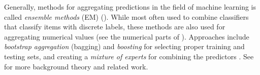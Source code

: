 Generally, methods for aggregating predictions in the field of machine learning is called \emph{ensemble methods} (EM) (\cite{Dietterich2000}).
While most often used to combine classifiers that classify items with discrete labels,
these methods are also used for aggregating numerical values (see the numerical parts of \cite{Breiman1996}).
Approaches include \emph{bootstrap aggregation} (bagging) and \emph{boosting} 
for selecting proper training and testing sets,
and creating a \emph{mixture of experts} for combining the predictors
\cite[p.27]{Polikar2006}.
See \cite{Bjorkoy2011} for more background theory and related work.
